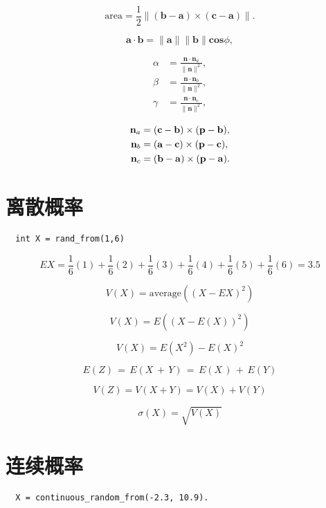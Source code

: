 \begin{equation}
  \mathrm{area}={\frac{1}{2}}\|(\mathbf{b}-\mathbf{a})\times(\mathbf{c}-\mathbf{a})\|.
\end{equation}

\[
  \mathbf{a \cdot b}=\|\mathbf{a}\|\|\mathbf{b}\|\mathbf{cos}\phi,
\]

\[
  \begin{aligned}
    \alpha & ={\frac{\mathbf{n}\cdot\mathbf{n}_a}{\|\mathbf{n}\|^{2}}}, \\
    \beta  & ={\frac{\mathbf{n}\cdot\mathbf{n}_b}{\|\mathbf{n}\|^{2}}}, \\
    \gamma & ={\frac{\mathbf{n}\cdot\mathbf{n}_c}{\|\mathbf{n}\|^{2}}},
  \end{aligned}
\]

\begin{equation}
  \begin{aligned}
    {\bf n}_{a} & =({\bf c}-{\bf b})\times({\bf p}-{\bf b}), \\
    {\bf n}_{b} & =({\bf a}-{\bf c})\times({\bf p}-{\bf c}), \\
    {\bf n}_{c} & =({\bf b}-{\bf a})\times({\bf p}-{\bf a}).
  \end{aligned}
\end{equation}

\section{离散概率}

\begin{lstlisting}
  int X = rand_from(1,6)
\end{lstlisting}

\[
  E X=\frac{1}{6}(1)+\frac{1}{6}(2)+\frac{1}{6}(3)+\frac{1}{6}(4)+\frac{1}{6}(5)+\frac{1}{6}(6)=3.5
\]

\[
  V(X)={\mathrm{average}}((X-EX)^{2})
\]

\[
  V(X)=E((X-E(X))^{2})
\]

\[
  V(X)=E(X^{2})-E(X)^{2}
\]

\[
  E(Z)\,=\,E(X\,+\,Y)\,=\,E(X\,)\,+\,E(Y)
\]

\[
  V(Z)=V(X+Y)=V(X)+V(Y)
\]

\[
  \sigma(X)=\sqrt{V(X)}
\]

\section{连续概率}

\begin{lstlisting}
  X = continuous_random_from(-2.3, 10.9).
\end{lstlisting}

